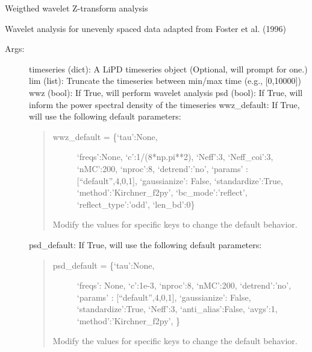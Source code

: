 \documentclass[letterpaper,10pt,english]{sphinxmanual}
\begin{document}
\begin{fulllineitems}
\label{\detokenize{Main:pyleoclim.wwzTs}}
Weigthed wavelet Z-transform analysis

Wavelet analysis for unevenly spaced data adapted from Foster et al. (1996)
\begin{description}
\item[{Args:}] \leavevmode
timeseries (dict): A LiPD timeseries object (Optional, will prompt for one.)
lim (list): Truncate the timeseries between min/max time (e.g., {[}0,10000{]})
wwz (bool): If True, will perform wavelet analysis
psd (bool): If True, will inform the power spectral density of the timeseries
wwz\_default: If True, will use the following default parameters:
\begin{quote}
\begin{description}
\item[{wwz\_default = \{‘tau’:None,}] \leavevmode
‘freqs’:None,
‘c’:1/(8*np.pi**2),
‘Neff’:3,
‘Neff\_coi’:3,
‘nMC’:200,
‘nproc’:8,
‘detrend’:’no’,
‘params’ : {[}“default”,4,0,1{]},
‘gaussianize’: False,
‘standardize’:True,
‘method’:’Kirchner\_f2py’,
‘bc\_mode’:’reflect’,
‘reflect\_type’:’odd’,
‘len\_bd’:0\}

\end{description}

Modify the values for specific keys to change the default behavior.
\end{quote}

psd\_default: If True, will use the following default parameters:
\begin{quote}
\begin{description}
\item[{psd\_default = \{‘tau’:None,}] \leavevmode
‘freqs’: None,
‘c’:1e-3,
‘nproc’:8,
‘nMC’:200,
‘detrend’:’no’,
‘params’ : {[}“default”,4,0,1{]},
‘gaussianize’: False,
‘standardize’:True,
‘Neff’:3,
‘anti\_alias’:False,
‘avgs’:1,
‘method’:’Kirchner\_f2py’,
\}

\end{description}

Modify the values for specific keys to change the default behavior.
\end{quote}


\end{description}
\end{fulllineitems}
\end{document}
